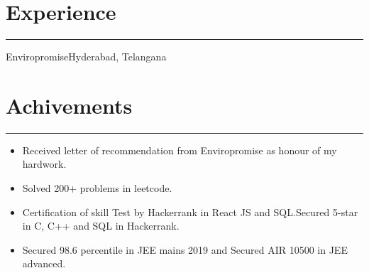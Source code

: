 \documentclass[]{rahulworld-resume}
\begin{document}
\begin{minipage}[t]{0.66\textwidth}
\section{Experience}
\noindent\rule{12.5cm}{0.4pt}
        {Enviropromise}{Hyderabad, Telangana}
  
\vspace{6pt}





\section{Achivements}
\noindent\rule{12.5cm}{0.4pt}

    	\begin{itemize}
    	 \item Received letter of recommendation from Enviropromise  as honour of my  hardwork. 
    	 \item Solved 200+ problems in leetcode.
          \item Certification of skill Test by Hackerrank in React JS and SQL.Secured 5-star in C, C++ and SQL in Hackerrank. 
          \item Secured 98.6 percentile in JEE mains 2019 and Secured AIR 10500 in JEE advanced.

		\end{itemize}



\end{minipage}
 
\end{document}
